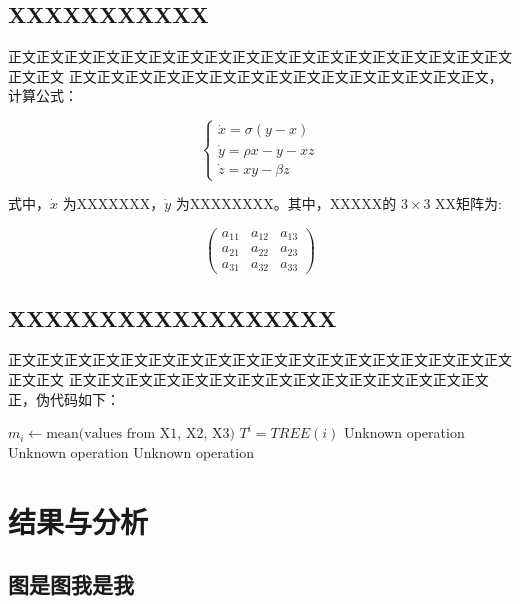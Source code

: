 \documentclass{hbutthesis}
\begin{document}
\section{XXXXXXXXXXX}

正文正文正文正文正文正文正文正文正文正文正文正文正文正文正文正文正文正文正文正文
正文正文正文正文正文正文正文正文正文正文正文正文正文正文正文，计算公式：

\begin{equation}
  \begin{cases}
    \dot{x} = \sigma (y - x) \\ %
    \dot{y} = \rho x - y - xz \\
    \dot{z} = xy - \beta z 
  \end{cases}
\end{equation}

式中，$\dot{x}$ 为XXXXXXX，$\dot{y}$ 为XXXXXXXX。其中，XXXXX的 $3 \times 3$ 
XX矩阵为:

\[
\begin{pmatrix}
  a_{11} & a_{12} & a_{13} \\
  a_{21} & a_{22} & a_{23} \\
  a_{31} & a_{32} & a_{33}
\end{pmatrix}
\]

\section{XXXXXXXXXXXXXXXXXX}

正文正文正文正文正文正文正文正文正文正文正文正文正文正文正文正文正文正文正文正文
正文正文正文正文正文正文正文正文正文正文正文正文正文正文正文正，伪代码如下：

\begin{algorithm}[http]
\caption{Calculation of XXXXXX}
\begin{algorithmic}[1] %
    \STATE $m_i \gets \text{mean(values from X1, X2, X3)}$
    \STATE $T^i = TREE(i)$
\ENDFOR
\STATE Unknown operation
\STATE Unknown operation
\STATE Unknown operation
\end{algorithmic}
\end{algorithm}

\newpage 
\chapter{结果与分析}

\section{图是图我是我}
\end{document}
